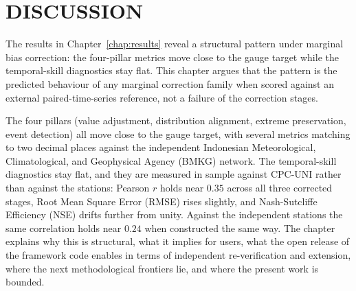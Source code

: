 %

\chapter{DISCUSSION}\label{chap:discussion}

The results in Chapter~\ref{chap:results} reveal a structural
pattern under marginal bias correction: the four-pillar metrics
move close to the gauge target while the temporal-skill
diagnostics stay flat. This chapter argues that the pattern is
the predicted behaviour of any marginal correction family when
scored against an external paired-time-series reference, not a
failure of the correction stages.

The four pillars (value
adjustment, distribution alignment, extreme preservation, event
detection) all move close to the gauge target, with several
metrics matching to two decimal places against the independent
Indonesian Meteorological, Climatological, and Geophysical Agency (BMKG) network.
The temporal-skill diagnostics stay flat, and they are measured
in sample against CPC-UNI rather than against the stations:
Pearson $r$ holds near $0.35$ across all three corrected stages,
Root Mean Square Error (RMSE) rises slightly, and
Nash-Sutcliffe Efficiency (NSE) drifts further from unity. Against
the independent stations the same correlation holds near $0.24$
when constructed the same way. The chapter
explains why this is structural, what it implies for users, what
the open release of the framework code enables in terms of
independent re-verification and extension, where the next
methodological frontiers lie, and where the present work is
bounded.


